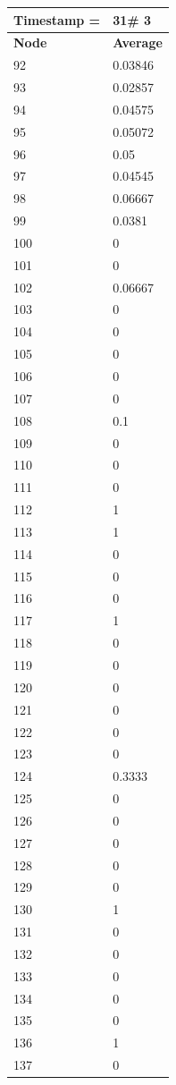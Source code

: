 \begin{tabular}{|l||l|}
\hline
\textbf{Timestamp =} & \textbf{31}\# 3\\\hline
	\textbf{Node} & \textbf{Average} \\ \hline
\hline
	92 & 0.03846 \\ \hline
	93 & 0.02857 \\ \hline
	94 & 0.04575 \\ \hline
	95 & 0.05072 \\ \hline
	96 & 0.05 \\ \hline
	97 & 0.04545 \\ \hline
	98 & 0.06667 \\ \hline
	99 & 0.0381 \\ \hline
	100 & 0 \\ \hline
	101 & 0 \\ \hline
	102 & 0.06667 \\ \hline
	103 & 0 \\ \hline
	104 & 0 \\ \hline
	105 & 0 \\ \hline
	106 & 0 \\ \hline
	107 & 0 \\ \hline
	108 & 0.1 \\ \hline
	109 & 0 \\ \hline
	110 & 0 \\ \hline
	111 & 0 \\ \hline
	112 & 1 \\ \hline
	113 & 1 \\ \hline
	114 & 0 \\ \hline
	115 & 0 \\ \hline
	116 & 0 \\ \hline
	117 & 1 \\ \hline
	118 & 0 \\ \hline
	119 & 0 \\ \hline
	120 & 0 \\ \hline
	121 & 0 \\ \hline
	122 & 0 \\ \hline
	123 & 0 \\ \hline
	124 & 0.3333 \\ \hline
	125 & 0 \\ \hline
	126 & 0 \\ \hline
	127 & 0 \\ \hline
	128 & 0 \\ \hline
	129 & 0 \\ \hline
	130 & 1 \\ \hline
	131 & 0 \\ \hline
	132 & 0 \\ \hline
	133 & 0 \\ \hline
	134 & 0 \\ \hline
	135 & 0 \\ \hline
	136 & 1 \\ \hline
	137 & 0 \\ \hline
\end{tabular}

